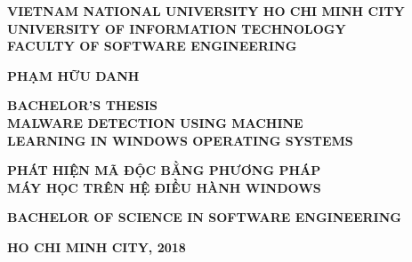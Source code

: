 %
\begin{titlepage}


\thisfancypage{
\setlength{\fboxrule}{2pt}
\setlength{\fboxsep}{15pt}
\doublebox
}{}


\begin{center}
  
\textbf{\large VIETNAM NATIONAL UNIVERSITY HO CHI MINH CITY} \\[2mm]
\textbf{\Large UNIVERSITY OF INFORMATION TECHNOLOGY} \\ [2mm]
\textbf{\Large FACULTY OF SOFTWARE ENGINEERING}

\vspace{0.1\textheight}
\begin{otherlanguage}{vietnamese}
\textbf{\large PHẠM HỮU DANH}
\end{otherlanguage}

\vspace{0.1\textheight}
\textbf{\Large BACHELOR’S THESIS} \\ [10mm]

\textbf{\Large MALWARE DETECTION USING MACHINE } \\ [2mm]
\textbf{\Large LEARNING IN WINDOWS OPERATING SYSTEMS } \\ [10mm]

\begin{otherlanguage}{vietnamese}
\textbf{ \Large PHÁT HIỆN MÃ ĐỘC BẰNG PHƯƠNG PHÁP } \\ [2mm]
\textbf{ \Large MÁY HỌC TRÊN HỆ ĐIỀU HÀNH WINDOWS }
\end{otherlanguage}

\vspace{0.15\textheight}

\textbf{\large BACHELOR OF SCIENCE IN SOFTWARE ENGINEERING}

\vspace{\fill}
\textbf{\large HO CHI MINH CITY, 2018}
\end{center}

\end{titlepage}
\cleardoublepage

